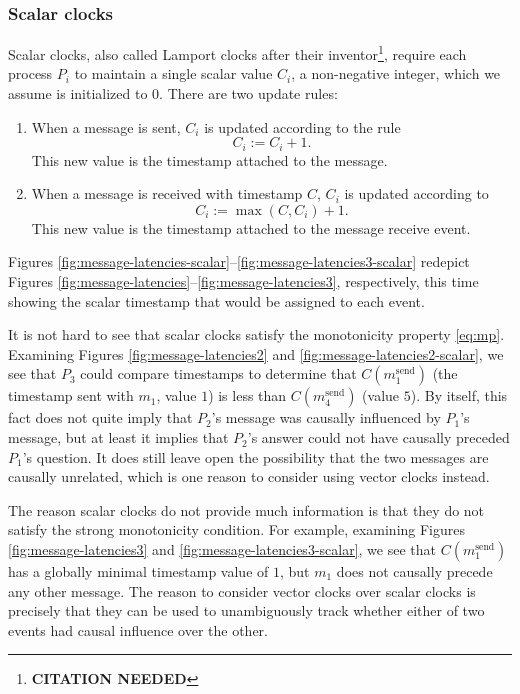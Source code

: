 \documentclass[]             %
{NASA}                       %
\theoremstyle{definition}
\newcommand{\citationneeded}{\footnote{\textbf{CITATION NEEDED}}}
\begin{document}
\subsubsection{Scalar clocks}
Scalar clocks, also called Lamport clocks after their
inventor\citationneeded, require each process $P_i$ to maintain a
single scalar value $C_i$, a non-negative integer, which we assume is
initialized to $0$. There are two update rules:

\begin{enumerate}
\item When a message is sent, $C_i$ is updated according to the rule
  \[C_i := C_i + 1.\]
  This new value is the timestamp attached to the message.
\item When a message is received with timestamp $C$, $C_i$ is updated according to
  \[C_i := \max(C, C_i) + 1.\]
  This new value is the timestamp attached to the message receive event.
\end{enumerate}
Figures
\ref{fig:message-latencies-scalar}--\ref{fig:message-latencies3-scalar}
redepict Figures
\ref{fig:message-latencies}--\ref{fig:message-latencies3},
respectively, this time showing the scalar timestamp that would be
assigned to each event.

It is not hard to see that scalar clocks satisfy the monotonicity
property \ref{eq:mp}. Examining Figures \ref{fig:message-latencies2}
and \ref{fig:message-latencies2-scalar}, we see that $P_3$ could
compare timestamps to determine that $C(m_1^\textrm{send})$ (the
timestamp sent with $m_1$, value $1$) is less than
$C(m_4^\textrm{send})$ (value $5$). By itself, this fact does not
quite imply that $P_2$'s message was causally influenced by $P_1$'s
message, but at least it implies that $P_2$'s answer could not have
causally preceded $P_1$'s question. It does still leave open the
possibility that the two messages are causally unrelated, which is one
reason to consider using vector clocks instead.

The reason scalar clocks do not provide much information is that they
do not satisfy the strong monotonicity condition. For example,
examining Figures \ref{fig:message-latencies3} and
\ref{fig:message-latencies3-scalar}, we see that
$C(m_1^\textrm{send})$ has a globally minimal timestamp value of $1$,
but $m_1$ does not causally precede any other message. The reason to
consider vector clocks over scalar clocks is precisely that they can
be used to unambiguously track whether either of two events had causal
influence over the other.
\end{document}

